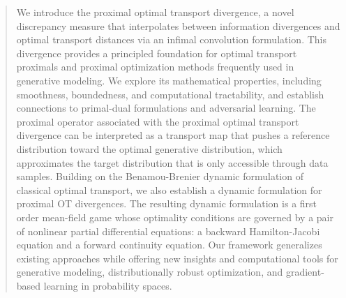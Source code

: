 \documentclass{amsart}
\newcommand{\MK}[1]{\textcolor{orange}{MK: #1}}
\theoremstyle{definition}
\theoremstyle{remark}
\numberwithin{equation}{section}
\begin{document}
\begin{abstract}
We introduce the proximal optimal transport divergence, a novel discrepancy measure that interpolates between information divergences and optimal transport distances via an infimal convolution formulation. This divergence provides a principled foundation for optimal transport proximals and proximal optimization methods frequently used in generative modeling. We explore its mathematical properties, including smoothness, boundedness, and computational tractability, and establish connections to primal-dual formulations and adversarial learning. The proximal operator associated with the proximal optimal transport divergence can be interpreted as a transport map that pushes a reference distribution 
toward the optimal generative distribution, which approximates the target distribution 
that is only accessible through data samples. Building on the Benamou-Brenier dynamic formulation of classical optimal transport, we also establish a dynamic formulation for proximal OT divergences. The resulting dynamic formulation is a first order mean-field game whose optimality conditions are governed by a pair of nonlinear partial differential equations: a backward Hamilton-Jacobi equation and a forward continuity equation. Our framework generalizes existing approaches while offering new insights and computational tools for generative modeling, distributionally robust optimization, and gradient-based learning in probability spaces. 

\end{abstract}

\maketitle


\end{document}
